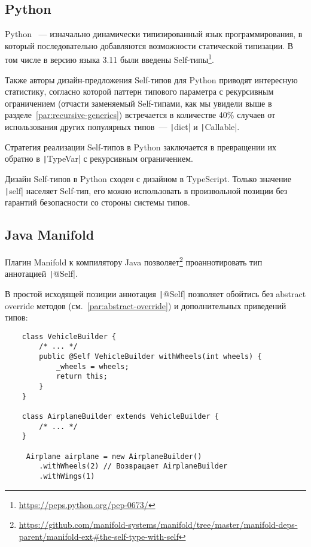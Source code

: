 \subsection{Python}

Python~\cite{sanner1999python} --- изначально динамически типизированный язык программирования, в который последовательно добавляются возможности статической типизации.
В том числе в версию языка 3.11 были введены Self-типы\footnote{\url{https://peps.python.org/pep-0673/}\label{foot:self-pep}}.

Также авторы дизайн-предложения Self-типов для Python приводят интересную статистику, согласно которой паттерн типового параметра с рекурсивным ограничением (отчасти заменяемый Self-типами, как мы увидели выше в разделе~\ref{par:recursive-generics}) встречается в количестве 40\% случаев от использования других популярных типов~--- \texttt|dict| и \texttt|Callable|.

Стратегия реализации Self-типов в Python заключается в превращении их обратно в \texttt|TypeVar| с рекурсивным ограничением.

Дизайн Self-типов в Python сходен с дизайном в TypeScript.
Только значение \texttt|self| населяет Self-тип, его можно использовать в произвольной позиции без гарантий безопасности со стороны системы типов.


\subsection{Java Manifold}

Плагин Manifold к компилятору Java позволяет\footnote{\url{https://github.com/manifold-systems/manifold/tree/master/manifold-deps-parent/manifold-ext\#the-self-type-with-self}} проаннотировать тип аннотацией \texttt|@Self|.

В простой исходящей позиции аннотация \texttt|@Self| позволяет обойтись без abstract override методов (см.~\ref{par:abstract-override}) и дополнительных приведений типов:

\begin{verbatim}
    class VehicleBuilder {
        /* ... */
        public @Self VehicleBuilder withWheels(int wheels) {
            _wheels = wheels;
            return this;
        }
    }

    class AirplaneBuilder extends VehicleBuilder {
        /* ... */
    }

     Airplane airplane = new AirplaneBuilder()
        .withWheels(2) // Возвращает AirplaneBuilder
        .withWings(1)
\end{verbatim}

